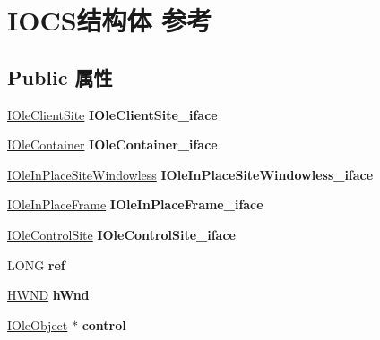 \hypertarget{struct_i_o_c_s}{}\section{I\+O\+C\+S结构体 参考}
\label{struct_i_o_c_s}
\subsection*{Public 属性}
\begin{DoxyCompactItemize}
\item 
\mbox{\label{struct_i_o_c_s_a56aeb185bc274c2bd84fe6b84792598e}} 
\hyperlink{interface_i_ole_client_site}{I\+Ole\+Client\+Site} {\bfseries I\+Ole\+Client\+Site\+\_\+iface}
\item 
\mbox{\label{struct_i_o_c_s_a077b4656806cbc1157c458d36edac723}} 
\hyperlink{interface_i_ole_container}{I\+Ole\+Container} {\bfseries I\+Ole\+Container\+\_\+iface}
\item 
\mbox{\label{struct_i_o_c_s_a1eccb304f71b6cab3d1a60998028df4d}} 
\hyperlink{interface_i_ole_in_place_site_windowless}{I\+Ole\+In\+Place\+Site\+Windowless} {\bfseries I\+Ole\+In\+Place\+Site\+Windowless\+\_\+iface}
\item 
\mbox{\label{struct_i_o_c_s_a6e9ce8f513bbc18b3684350218d42a18}} 
\hyperlink{interface_i_ole_in_place_frame}{I\+Ole\+In\+Place\+Frame} {\bfseries I\+Ole\+In\+Place\+Frame\+\_\+iface}
\item 
\mbox{\label{struct_i_o_c_s_a1b23eee40f83f2610a65eb6542635d56}} 
\hyperlink{interface_i_ole_control_site}{I\+Ole\+Control\+Site} {\bfseries I\+Ole\+Control\+Site\+\_\+iface}
\item 
\mbox{\label{struct_i_o_c_s_a8c9030c00a03d15648f05a64428f27b2}} 
L\+O\+NG {\bfseries ref}
\item 
\mbox{\label{struct_i_o_c_s_aa516ef1184f0d13d88b8a2768595a5e6}} 
\hyperlink{interfacevoid}{H\+W\+ND} {\bfseries h\+Wnd}
\item 
\mbox{\label{struct_i_o_c_s_a4a949711997597769c34afe92aac898b}} 
\hyperlink{interface_i_ole_object}{I\+Ole\+Object} $\ast$ {\bfseries control}

\end{DoxyCompactItemize}
